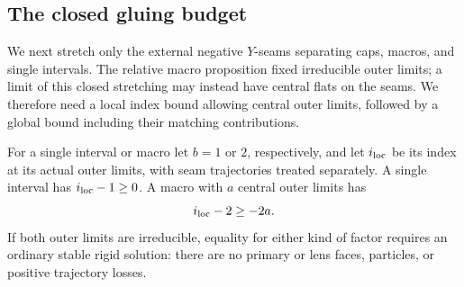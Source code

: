 \subsection{The closed gluing budget}

We next stretch only the external negative \(Y\)-seams separating
caps, macros, and single intervals.  The relative macro proposition
fixed irreducible outer limits; a limit of this closed stretching may
instead have central flats on the seams.  We therefore need a local
index bound allowing central outer limits, followed by a global bound
including their matching contributions.

\begin{lemma}
\label{lem:stack:local-excess}
For a single interval or macro let \(b=1\) or \(2\), respectively,
and let \(i_{\rm loc}\) be its index at its actual outer limits,
with seam trajectories treated separately.  A single interval has
\(i_{\rm loc}-1\ge0\).  A macro with \(a\) central outer limits
has
\begin{equation}
 i_{\rm loc}-2\ge-2a.
\label{eq:stack:macro-excess}
\end{equation}
If both outer limits are irreducible, equality for either kind of
factor requires an ordinary stable rigid solution: there are no
primary or lens faces, particles, or positive trajectory losses.
\end{lemma}

